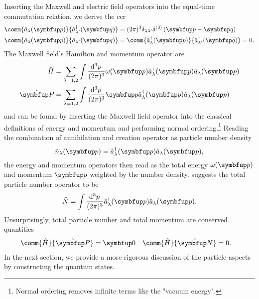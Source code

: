 Inserting the Maxwell and electric field operators into the equal-time commutation relation, we derive the \gls{ccr}
\begin{align}
	\comm{\hat{a}_\lambda(\vb{p})}{\hat{a}_{\lambda^\prime}^\dagger(\vb{q})}
	&=
	(2\pi)^3
	\delta_{\lambda\lambda^\prime}
	\delta^{(3)}\left(\vb{p}-\vb{q}\right)
	\label{eq:canonical_commutation_relation_nonzero}
	\\
	\comm{\hat{a}_\lambda(\vb{p})}{\hat{a}_{\lambda^\prime}(\vb{q})}
	&=
	\comm{\hat{a}_\lambda^\dagger(\vb{p})}{\hat{a}_{\lambda^\prime}^\dagger(\vb{q})}
	=
	0
	\label{eq:canonical_commutation_relation_zero}
	.
\end{align}
The Maxwell field's Hamilton and momentum operator are~\cite[p.~199]{Greiner2013}
\begin{align}
	\hat{H}
	&=
	\sum_{\lambda=1,2}
	\int\frac{\dd[3]{p}}{(2\pi)^3}
	\omega(\vb{p})
	\hat{a}_\lambda^\dagger(\vb{p})
	\hat{a}_\lambda(\vb{p})
	\label{eq:maxwell_hamilton_operator}
	\\
	\vu{P}
	&=
	\sum_{\lambda=1,2}
	\int\frac{\dd[3]{p}}{(2\pi)^3}
	\vb{p}
	\hat{a}_\lambda^\dagger(\vb{p})
	\hat{a}_\lambda(\vb{p})
	\label{eq:maxwell_momentum_operator}
\end{align}
and can be found by inserting the Maxwell field operator into the classical definitions of energy and momentum and performing normal ordering.\footnote{Normal ordering removes infinite terms like the "vacuum energy".}
Reading the combination of annihilation and creation operator as particle number density
\begin{equation}
	\hat{n}_\lambda(\vb{p})
	=
	\hat{a}_\lambda^\dagger(\vb{p})
	\hat{a}_\lambda(\vb{p})
	\label{eq:maxwell_number_density_operator}
	,
\end{equation}
the energy and momentum operators then read as the total energy $\omega(\vb{p})$ and momentum $\vb{p}$ weighted by the number density.
 suggests the total particle number operator to be
\begin{equation}
	\hat{N}
	=
	\int\frac{\dd[3]{p}}{(2\pi)^3}
	\hat{a}_\lambda^\dagger(\vb{p})
	\hat{a}_\lambda(\vb{p})
	\label{eq:maxwell_number_operator}
	.
\end{equation}
Unsurprisingly, total particle number and total momentum are conserved quantities
\begin{align}
	\comm{\hat{H}}{\vu{P}}
	&=
	\vb{0}
	&
	\comm{\hat{H}}{\vu{N}}
	&=
	0
	.
\end{align}
In the next section, we provide a more rigorous discussion of the particle aspects by constructing the quantum states.